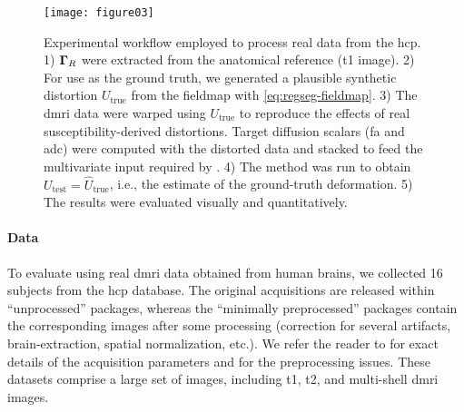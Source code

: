 \begin{figure*}
\texttt{[image: figure03]}
\caption{Experimental workflow employed to process real data from the \acrfull*{hcp}.
  1) $\boldsymbol{\Gamma}_R$ were extracted from the anatomical reference (\gls*{t1} image).
  2) For use as the ground truth, we generated a plausible synthetic distortion $U_\text{true}$
    from the fieldmap with \eqref{eq:regseg-fieldmap}.
  3) The \gls*{dmri} data were warped using $U_\text{true}$ to reproduce the effects of real
    susceptibility-derived distortions.
  Target diffusion scalars (\gls*{fa} and \gls*{adc}) were computed with the distorted data and
    stacked to feed the multivariate input required by \regseg{}.
  4) The method was run to obtain $U_\text{test} = \hat{U}_\text{true}$, i.e., the estimate of
    the ground-truth deformation.
  5) The results were evaluated visually and quantitatively.
  }\label{fig:regseg-evworkflows}
\end{figure*}


\paragraph*{Data}
To evaluate \regseg{} using real \gls*{dmri} data obtained from human brains,
  we collected 16 subjects from the \gls*{hcp} database.
The original acquisitions are released within ``unprocessed'' packages, whereas
  the ``minimally preprocessed'' packages contain the corresponding images after
  some processing (correction for several artifacts, brain-extraction, spatial
  normalization, etc.).
We refer the reader to \citet{essen_human_2012} for exact details of the acquisition
  parameters and \citet{glasser_minimal_2013} for the preprocessing issues.
These datasets comprise a large set of images, including \gls*{t1}, \gls*{t2}, and
  multi-shell \gls*{dmri} images.

